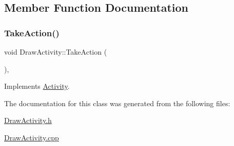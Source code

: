 \subsection{Member Function Documentation}
\mbox{\label{class_draw_activity_a0ca36e1d0c5e3ff16fe1e33432d245bf}} 
\subsubsection{\texorpdfstring{TakeAction()}{TakeAction()}}
{\footnotesize\ttfamily void Draw\+Activity\+::\+Take\+Action (\begin{DoxyParamCaption}{ }\end{DoxyParamCaption})\hspace{0.3cm}{\ttfamily [override]}, {\ttfamily [virtual]}}



Implements \mbox{\hyperlink{class_activity_af1bed13c5ae595ee7940dee2d34f7989}{Activity}}.



The documentation for this class was generated from the following files\+:\begin{DoxyCompactItemize}
\item 
\mbox{\hyperlink{_draw_activity_8h}{Draw\+Activity.\+h}}\item 
\mbox{\hyperlink{_draw_activity_8cpp}{Draw\+Activity.\+cpp}}\end{DoxyCompactItemize}
